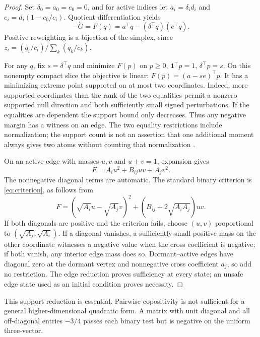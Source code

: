 \begin{proof}
Set $\delta_0=a_0=e_0=0$, and for active indices let
$a_i=\delta_i d_i$ and $e_i=d_i(1-c_0/c_i)$.
Quotient differentiation yields
\begin{equation}\label{eq:F}
-\dot G=F(q)=a^\top q-(\delta^\top q)(e^\top q).
\end{equation}
Positive reweighting is a bijection of the simplex, since
$z_i=(q_i/c_i)/\sum_k(q_k/c_k)$.

For any $q$, fix $s=\delta^\top q$ and minimize $F(p)$ on
$p\ge0$, $\mathbf1^\top p=1$, $\delta^\top p=s$.
On this nonempty compact slice the objective is linear:
$F(p)=(a-se)^\top p$.
It has a minimizing extreme point supported on at most two coordinates. Indeed, more supported coordinates than the rank of the two equalities permit a nonzero supported null direction and both sufficiently small signed perturbations. If the equalities are dependent the support bound only decreases. Thus any negative margin has a witness on an edge. The two equality restrictions include normalization; the support count is not an assertion that one additional moment always gives two atoms without counting that normalization \cite{moment,pinelis}.

On an active edge with masses $u,v$ and $u+v=1$, expansion gives
\begin{equation}\label{eq:binary}
F=A_i u^2+B_{ij}uv+A_jv^2.
\end{equation}
The nonnegative diagonal terms are automatic. The standard binary criterion is \eqref{eq:criterion}, as follows from
\[
F=(\sqrt{A_i}u-\sqrt{A_j}v)^2+
(B_{ij}+2\sqrt{A_iA_j})uv.
\]
If both diagonals are positive and the criterion fails, choose $(u,v)$ proportional to $(\sqrt{A_j},\sqrt{A_i})$. If a diagonal vanishes, a sufficiently small positive mass on the other coordinate witnesses a negative value when the cross coefficient is negative; if both vanish, any interior edge mass does so. Dormant--active edges have diagonal zero at the dormant vertex and nonnegative cross coefficient $a_j$, so add no restriction. The edge reduction proves sufficiency at every state; an unsafe edge state used as an initial condition proves necessity.
\end{proof}

This support reduction is essential. Pairwise copositivity is not sufficient for a general higher-dimensional quadratic form. A matrix with unit diagonal and all off-diagonal entries $-3/4$ passes each binary test but is negative on the uniform three-vector.

